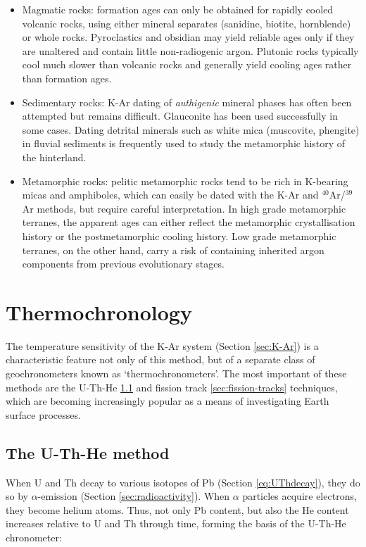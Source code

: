\documentclass{book}
\begin{document}
\begin{itemize}
\item{Magmatic rocks:} formation ages can only be obtained for rapidly
  cooled volcanic rocks, using either mineral separates (sanidine,
  biotite, hornblende) or whole rocks. Pyroclastics and obsidian may
  yield reliable ages only if they are unaltered and contain little
  non-radiogenic argon. Plutonic rocks typically cool much slower than
  volcanic rocks and generally yield cooling ages rather than
  formation ages.
\item{Sedimentary rocks:} K-Ar dating of \emph{authigenic} mineral
  phases has often been attempted but remains difficult. Glauconite
  has been used successfully in some cases. Dating detrital minerals
  such as white mica (muscovite, phengite) in fluvial sediments is
  frequently used to study the metamorphic history of the hinterland.
\item{Metamorphic rocks:} pelitic metamorphic rocks tend to be rich in
  K-bearing micas and amphiboles, which can easily be dated with the
  K-Ar and $^{40}$Ar/$^{39}$Ar methods, but require careful
  interpretation. In high grade metamorphic terranes, the apparent
  ages can either reflect the metamorphic crystallisation history or
  the postmetamorphic cooling history. Low grade metamorphic terranes,
  on the other hand, carry a risk of containing inherited argon
  components from previous evolutionary stages.
\end{itemize}

\chapter{Thermochronology}

The temperature sensitivity of the K-Ar system (Section
\ref{sec:K-Ar}) is a characteristic feature not only of this method,
but of a separate class of geochronometers known as
`thermochronometers'.  The most important of these methods are the
U-Th-He \ref{sec:U-Th-He} and fission track \ref{sec:fission-tracks}
techniques, which are becoming increasingly popular as a means of
investigating Earth surface processes.

\section{The U-Th-He method}
\label{sec:U-Th-He}

When U and Th decay to various isotopes of Pb (Section
\ref{eq:UThdecay}), they do so by $\alpha$-emission (Section
\ref{sec:radioactivity}). When $\alpha$ particles acquire electrons,
they become helium atoms. Thus, not only Pb content, but also the He
content increases relative to U and Th through time, forming the basis
of the U-Th-He chronometer:
\end{document}
